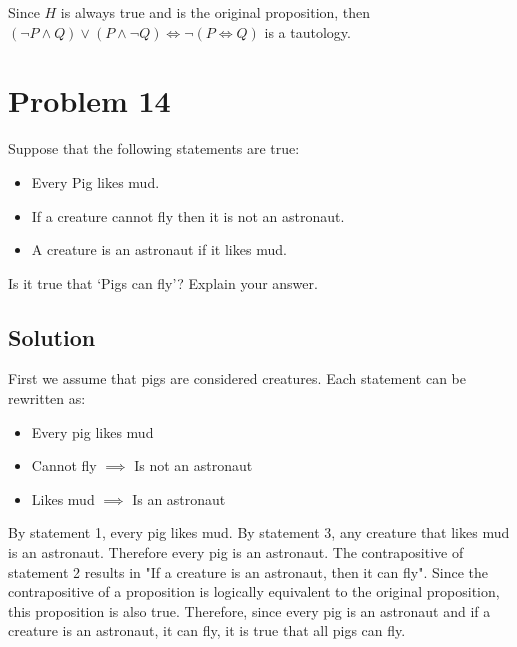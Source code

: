 \documentclass[12pt]{extarticle}
\begin{document}
Since $H$ is always true and is the original proposition, then $(\lnot P \land Q) \lor (P \land \lnot Q) \Longleftrightarrow \lnot(P \Longleftrightarrow Q)$ is a tautology.


\section*{Problem 14}

Suppose that the following statements are true: 

\begin{itemize}
  \item Every Pig likes mud. 
  \item If a creature cannot fly then it is not an astronaut. 
  \item A creature is an astronaut if it likes mud. 
\end{itemize}

Is it true that ‘Pigs can fly’? Explain your answer. 

\subsection*{Solution}

First we assume that pigs are considered creatures. Each statement can be rewritten as:

\begin{itemize}
	\item Every pig likes mud
	\item Cannot fly $\implies$ Is not an astronaut
	\item Likes mud $\implies$ Is an astronaut
\end{itemize}

By statement 1, every pig likes mud. By statement 3, any creature that likes mud is an astronaut. Therefore every pig is an astronaut. The contrapositive of statement 2 results in "If a creature is an astronaut, then it can fly". Since the contrapositive of a proposition is logically equivalent to the original proposition, this proposition is also true. Therefore, since every pig is an astronaut and if a creature is an astronaut, it can fly, it is true that all pigs can fly.
\end{document}
